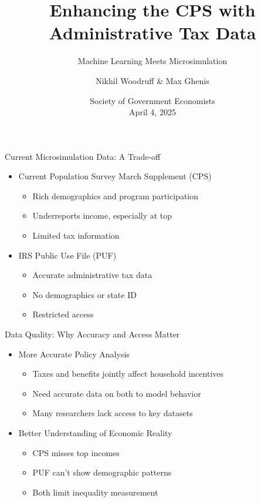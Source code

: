 \documentclass{beamer}
\title{Enhancing the CPS with Administrative Tax Data}
\subtitle{Machine Learning Meets Microsimulation}
\author[Woodruff \& Ghenis]{Nikhil Woodruff \& Max Ghenis}
\institute{PolicyEngine}
\date{Society of Government Economists\\April 4, 2025}
\begin{document}
\begin{frame}
    \titlepage
\end{frame}

\begin{frame}{Current Microsimulation Data: A Trade-off}
    \begin{itemize}
        \item Current Population Survey March Supplement (CPS)
        \begin{itemize}
            \item Rich demographics and program participation
            \item Underreports income, especially at top
            \item Limited tax information
        \end{itemize}
        \pause
        \item IRS Public Use File (PUF)
        \begin{itemize}
            \item Accurate administrative tax data
            \item No demographics or state ID
            \item Restricted access
        \end{itemize}
    \end{itemize}
\end{frame}

\begin{frame}{Data Quality: Why Accuracy and Access Matter}
    \begin{itemize}
        \item More Accurate Policy Analysis
        \begin{itemize}
            \item Taxes and benefits jointly affect household incentives
            \item Need accurate data on both to model behavior
            \item Many researchers lack access to key datasets
        \end{itemize}
        \pause
        \item Better Understanding of Economic Reality
        \begin{itemize}
            \item CPS misses top incomes
            \item PUF can't show demographic patterns
            \item Both limit inequality measurement
        \end{itemize}
    \end{itemize}
\end{frame}
\end{document}
